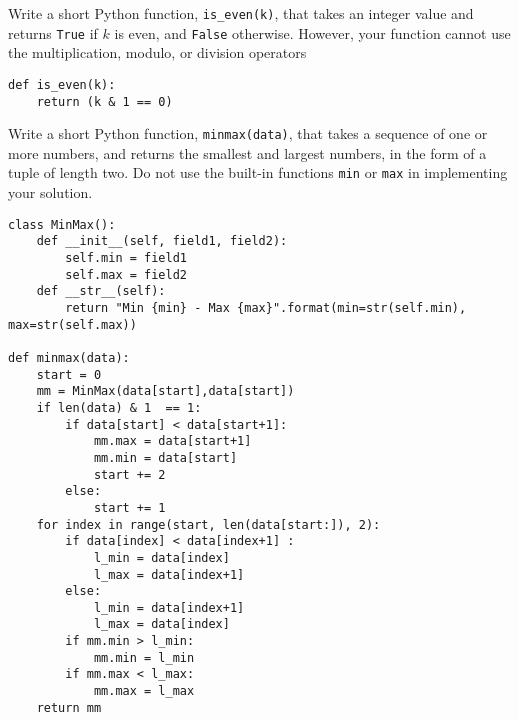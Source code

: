  \label{sssec:ex1_2}

Write a short Python function, \texttt{is_even(k)}, that takes an integer value and returns \texttt{True} if $k$ is even, and \texttt{False} otherwise. However, your function cannot use the multiplication, modulo, or division operators

\begin{lstlisting}
def is_even(k):
    return (k & 1 == 0)
\end{lstlisting}

 \label{sssec:ex1_3}

Write a short Python function, \texttt{minmax(data)}, that takes a sequence of one or more numbers, and returns the smallest and largest numbers, in the form of a tuple of length two. Do not use the built-in functions \texttt{min} or \texttt{max} in implementing your solution.

\begin{lstlisting}
class MinMax():
    def __init__(self, field1, field2):
        self.min = field1
        self.max = field2
    def __str__(self):
        return "Min {min} - Max {max}".format(min=str(self.min), max=str(self.max))

def minmax(data):
    start = 0
    mm = MinMax(data[start],data[start])
    if len(data) & 1  == 1:
        if data[start] < data[start+1]:
            mm.max = data[start+1]
            mm.min = data[start]
            start += 2
        else:
            start += 1
    for index in range(start, len(data[start:]), 2):
        if data[index] < data[index+1] :
            l_min = data[index]
            l_max = data[index+1]
        else:
            l_min = data[index+1]
            l_max = data[index]
        if mm.min > l_min:
            mm.min = l_min
        if mm.max < l_max:
            mm.max = l_max
    return mm
\end{lstlisting}